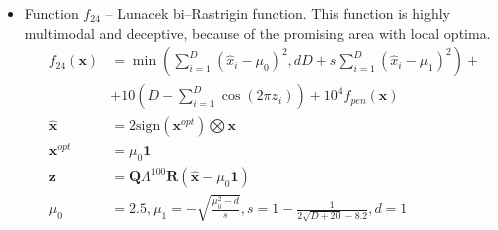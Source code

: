 \begin{itemize}
\begin{align*}
\begin{array}{ll}
\begin{array}{l}
                        \text{sampled randomly without} \\
                        \text{replacement otherwise}
                    \end{array}
            \end{array}
        \right.
    \end{align*}
    \item Function $f_{24}$ -- Lunacek bi--Rastrigin function. This function is highly multimodal and deceptive, because of the promising area with local optima.
    \begin{align*}
        f_{24}\left(\mathbf{x}\right) &=
            \min\left( \sum_{i=1}^D\left(\hat{x}_i-\mu_0\right)^2, dD+s\sum_{i=1}^D\left(\hat{x}_i-\mu_1\right)^2 \right) + \\
            &+ 10\left(D-\sum_{i=1}^D \cos\left(2\pi z_i\right)\right)
            + 10^4 f_{pen}\left(\mathbf{x}\right) \\
        \hat{\mathbf{x}} &= 2 \text{sign}\left(\mathbf{x}^{opt}\right) \bigotimes \mathbf{x} \\
        \mathbf{x}^{opt} &= \mu_0 \mathbf{1} \\
        \mathbf{z} &= \mathbf{Q}\Lambda^{100}\mathbf{R}\left(\hat{\mathbf{x}}-\mu_0\mathbf{1}\right) \\
        \mu_0&=2.5,\mu_1=-\sqrt{\frac{\mu_0^2-d}{s}}, s=1-\frac{1}{2\sqrt{D+20}-8.2},d=1
    \end{align*}
\end{itemize}




\section{}
